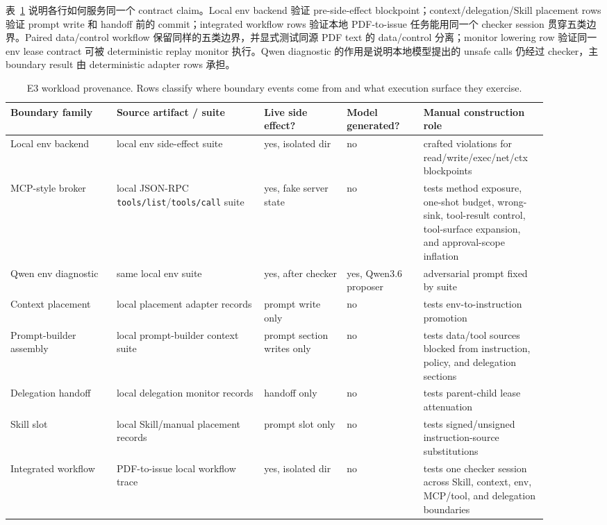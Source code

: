 \documentclass[UTF8,a4paper,11pt]{ctexart}
\begin{document}
表~\ref{tab:e3-boundary-provenance} 说明各行如何服务同一个 contract claim。Local env backend 验证 pre-side-effect blockpoint；context/delegation/Skill placement rows 验证 prompt write 和 handoff 前的 commit；integrated workflow rows 验证本地 PDF-to-issue 任务能用同一个 checker session 贯穿五类边界。Paired data/control workflow 保留同样的五类边界，并显式测试同源 PDF text 的 data/control 分离；monitor lowering row 验证同一 env lease contract 可被 deterministic replay monitor 执行。Qwen diagnostic 的作用是说明本地模型提出的 unsafe calls 仍经过 checker，主 boundary result 由 deterministic adapter rows 承担。

\begin{table}[t]
\centering
\tiny
\setlength{\tabcolsep}{2pt}
\caption{E3 workload provenance. Rows classify where boundary events come from and what execution surface they exercise.}
\label{tab:e3-boundary-provenance}
\begin{tabular}{p{0.18\linewidth}p{0.25\linewidth}p{0.14\linewidth}p{0.13\linewidth}p{0.20\linewidth}}
\toprule
Boundary family & Source artifact / suite & Live side effect? & Model generated? & Manual construction role \\
\midrule
Local env backend & local env side-effect suite & yes, isolated dir & no & crafted violations for read/write/exec/net/ctx blockpoints \\
MCP-style broker & local JSON-RPC \texttt{tools/list}/\texttt{tools/call} suite & yes, fake server state & no & tests method exposure, one-shot budget, wrong-sink, tool-result control, tool-surface expansion, and approval-scope inflation \\
Qwen env diagnostic & same local env suite & yes, after checker & yes, Qwen3.6 proposer & adversarial prompt fixed by suite \\
Context placement & local placement adapter records & prompt write only & no & tests env-to-instruction promotion \\
Prompt-builder assembly & local prompt-builder context suite & prompt section writes only & no & tests data/tool sources blocked from instruction, policy, and delegation sections \\
Delegation handoff & local delegation monitor records & handoff only & no & tests parent-child lease attenuation \\
Skill slot & local Skill/manual placement records & prompt slot only & no & tests signed/unsigned instruction-source substitutions \\
Integrated workflow & PDF-to-issue local workflow trace & yes, isolated dir & no & tests one checker session across Skill, context, env, MCP/tool, and delegation boundaries \\

\end{tabular}
\end{table}
\end{document}
